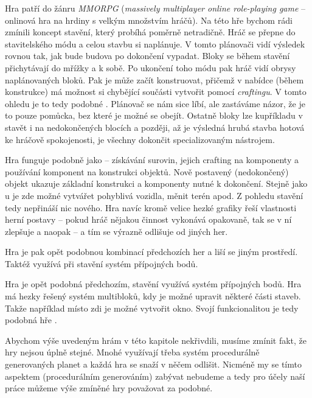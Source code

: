 Hra \NI{} patří do žánru \textit{MMORPG} (\textit{massively multiplayer online role-playing game} -- onlinová hra na hrdiny s velkým množstvím hráčů). Na této hře bychom rádi zmínili koncept stavění, který probíhá poměrně netradičně. Hráč se přepne do stavitelského módu a celou stavbu si naplánuje. V tomto plánovači vidí výsledek rovnou tak, jak bude budova po dokončení vypadat. Bloky se během stavění přichytávají do mřížky a k sobě. Po ukončení toho módu pak hráč vidí obrysy naplánovaných bloků. Pak je může začít konstruovat, přičemž v nabídce (během konstrukce) má možnost si chybějící součásti vytvořit pomocí \textit{craftingu}. V tomto ohledu je to tedy podobné \SE{}. Plánovač se nám sice líbí, ale zastáváme názor, že je to pouze pomůcka, bez které je možné se obejít. Ostatně bloky lze kupříkladu v \SE{} stavět i na nedokončených blocích a později, až je výsledná hrubá stavba hotová ke hráčově spokojenosti, je všechny dokončit specializovaným nástrojem.


Hra \PN{} funguje podobně jako \SE{} -- získávání surovin, jejich crafting na komponenty a používání komponent na konstrukci objektů. Nově postavený (nedokončený) objekt ukazuje základní konstrukci a komponenty nutné k dokončení. Stejně jako u \SE{} je zde možné vytvářet pohyblivá vozidla, měnit terén apod. Z pohledu stavění tedy nepřináší nic nového. Hra navíc kromě velice hezké grafiky řeší vlastnosti herní postavy -- pokud hráč nějakou činnost vykonává opakovaně, tak se v ní zlepšuje a naopak -- a tím se výrazně odlišuje od jiných her.


Hra \ARK{} je pak opět podobnou kombinací předchozích her a liší se jiným prostředí. Taktéž využívá při stavění systém přípojných bodů.

Hra \NMS{} je opět podobná předchozím, stavění využívá systém přípojných bodů. Hra má hezky řešený systém multibloků, kdy je možné upravit některé části staveb. Takže například místo zdi je možné vytvořit okno. Svojí funkcionalitou je tedy podobná hře \SE{}.

Abychom výše uvedeným hrám v této kapitole nekřivdili, musíme zmínit fakt, že hry nejsou úplně stejné. Mnohé využívají třeba systém procedurálně generovaných planet a každá hra se snaží v něčem odlišit. Nicméně my se tímto aspektem (procedurálním generováním) zabývat nebudeme a tedy pro účely naší práce můžeme výše zmíněné hry považovat za podobné.

